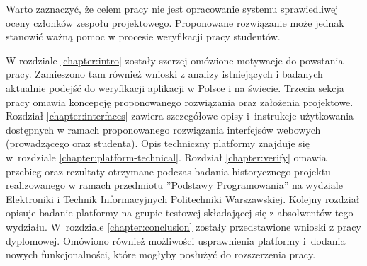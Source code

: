 Warto zaznaczyć, że celem pracy nie jest opracowanie systemu sprawiedliwej oceny członków zespołu projektowego.
Proponowane rozwiązanie może jednak stanowić ważną pomoc w procesie weryfikacji pracy studentów.

W rozdziale \ref{chapter:intro} zostały szerzej omówione motywacje do powstania pracy.
Zamieszono tam również wnioski z analizy istniejących i badanych aktualnie podejść do weryfikacji aplikacji w Polsce i na świecie.
Trzecia sekcja pracy omawia koncepcję proponowanego rozwiązania oraz założenia projektowe.
Rozdział \ref{chapter:interfaces} zawiera szczegółowe opisy i~instrukcje użytkowania dostępnych w ramach proponowanego rozwiązania interfejsów webowych (prowadzącego oraz studenta).
Opis techniczny platformy znajduje się w~rozdziale \ref{chapter:platform-technical}.
Rozdział \ref{chapter:verify} omawia przebieg oraz rezultaty otrzymane podczas badania historycznego projektu realizowanego w ramach przedmiotu ”Podstawy Programowania” na wydziale Elektroniki i Technik Informacyjnych Politechniki Warszawskiej.
Kolejny rozdział opisuje badanie platformy na grupie testowej składającej się z absolwentów tego wydziału.
W~rozdziale \ref{chapter:conclusion} zostały przedstawione wnioski z pracy dyplomowej.
Omówiono również możliwości usprawnienia platformy i~dodania nowych funkcjonalności, które mogłyby posłużyć do rozszerzenia pracy.





